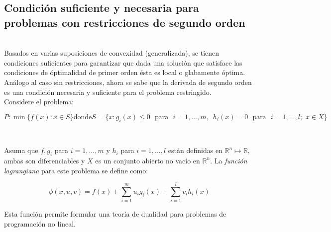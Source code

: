 \subsection{Condici\'on suficiente y necesaria para problemas con restricciones de segundo orden}
~\\

Basados en varias suposiciones de convexidad (generalizada), se tienen condiciones suficientes para garantizar que dada una soluci\'on que
satisface las condiciones de \'optimalidad de primer orden \'esta es local o glabamente \'optima. An\'alogo al caso sin restricciones, ahora se
sabe que la derivada de segundo orden es una condici\'on necesaria y suficiente para el problema restringido.\cite{no-lineal}\\
Considere el problema:

\begin{subequations}
   \begin{equation}
      P: \min \{f(x): x \in S\}
   \end{equation}
   \mbox{donde}
   \begin{equation}
      S = \{x: g_i(x) \leqslant 0\,\, \mbox{ para }\,\, i=1, \ldots , m,\,\,\, h_i(x) = 0\,\, \mbox{ para }\,\,  i=1, \ldots , l;\,\, x \in X\}
   \end{equation}
\end{subequations}

~\medskip

Asuma que $f, g_i$ para $i=1, \ldots , m $ y $ h_i $ para $ i=1, \ldots , l $ est\'an definidas en $\mathbb{R}^n \longmapsto \mathbb{R}, $ 
ambas son diferenciables y $X$ es un conjunto abierto no vac\'io en $\mathbb{R}^n.$ La {\it funci\'on lagrangiana} para este problema se
define como:

\begin{equation}
   \phi (x, u, v) = f(x) + \displaystyle{\sum_{i=1}^{m} u_i g_i(x) + \sum_{i=1}^{l} v_i h_i(x)}
\end{equation}
\medskip

Esta funci\'on permite formular una teor\'ia de dualidad para problemas de programaci\'on no lineal.




